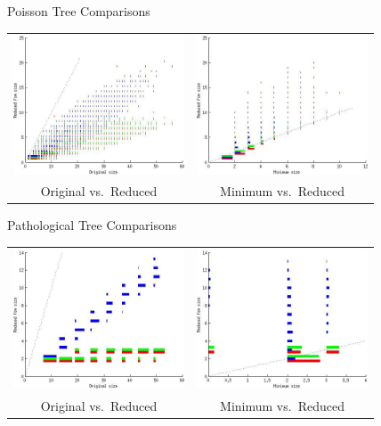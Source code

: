 \begin{tframe}{Poisson Tree Comparisons}
\begin{center}
\begin{tabular}{cc}
\includegraphics[width=2in]{media_minrep/poiss_orig}&
\includegraphics[width=2in]{media_minrep/poiss_exact}\\
Original vs.\ Reduced &
Minimum vs.\ Reduced
\end{tabular}
\end{center}
\end{tframe}

\begin{tframe}{Pathological Tree Comparisons}
\begin{center}
\begin{tabular}{cc}
\includegraphics[width=2in]{media_minrep/patho_orig}&
\includegraphics[width=2in]{media_minrep/patho_exact}\\
Original vs.\ Reduced &
Minimum vs.\ Reduced
\end{tabular}
\end{center}
\end{tframe}

